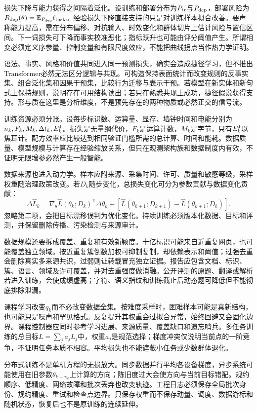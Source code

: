 损失下降与能力获得之间隔着泛化。设训练和部署分布为$P_{\rm tr}$与$P_{\rm dep}$，部署风险为$R_{\rm dep}(\theta)=\mathbb E_{P_{\rm dep}}\ell_{\rm task}$。经验损失下降直接支持的只是对训练样本拟合改善。要声称能力提高，需在分布偏移、对抗输入、时效变化和群体切片上估计风险与置信区间。下一词损失可下降而事实校准恶化；指标跃升也可能由评分阈值产生。所谓相变必须定义序参量、控制变量和有限尺度效应，不能把曲线拐点当作热力学证明。

语法、事实、风格和价值共同进入同一预测损失，确实会造成捷径学习，但不推出Transformer必然无法区分逻辑与共现。可构造保持表面统计而改变规则的反事实集、组合泛化集和因果干预集，比较行为迁移与表示干预。若模型在新实体和新句式上保持规则，说明存在可用结构读出；若只在熟悉共现上成功，捷径假说获得支持。形与质在这里是分析维度，不是预先存在的两种物质或必然正交的信号流。

训练资源必须分账。设每步标识数、运算量、显存、墙钟时间和电能分别为$n_k,F_k,M_k,\Delta t_k,E_k^{\rm J}$。损失是无量纲代价，$F_k$是运算计数，$M_k$是字节，只有$E_k^{\rm J}$以焦耳计。配方效率应比较达到相同验证门槛所需的总计算、时间和能耗。数据质量、模型规模与计算存在经验缩放关系，但只在观测架构族和数据制度内有效，不证明无限增参必然产生一般智能。

数据来源也进入动力学。样本应附来源、采集时间、许可、质量和敏感等级，采样权重随治理政策改变。若$D_k$随步变化，总损失变化可分为参数贡献与数据变化贡献：
\[
\Delta\widehat L_k=\nabla_\theta\widehat L(\theta_k;D_k)^{\mathsf T}
\Delta\theta_k+[\widehat L(\theta_{k+1};D_{k+1})-\widehat L(\theta_{k+1};D_k)].
\]
忽略第二项，会把目标漂移误判为优化变化。持续训练必须版本化数据、目标和评测，并保留删除传播、污染检测与来源审计。

数据规模还要拆成覆盖、重复和有效新颖度。十亿标识可能来自近重复网页，也可能覆盖独立领域。按近重复簇倒数加权可抑制复制，却依赖表示和阈值；过强去重会删除真实多来源共识，过弱则让转载冒充独立证据。报告应包含文档、标识、簇、语言、领域及许可覆盖，并对去重强度做消融。公开评测的原题、翻译或解析若进入训练，会使成绩虚高；字符、语义指纹和训练截止后动态题可降低但不能彻底排除泄漏。

课程学习改变$q_k$而不必改变数据全集。按难度采样时，困难样本可能是真新结构，也可能只是噪声和罕见格式。反复提升其权重会过拟合异常，始终回避又会固化边界。课程控制器应同时参考学习进展、来源质量、覆盖缺口和遗忘哨兵。多任务训练的总目标$L=\sum_j a_jL_j$中，权重$a_j$是规范选择；梯度冲突仅说明当前点的一阶竞争，不证明任务本质不相容。平均损失也不能遮蔽小任务或少数群体退化。

分布式训练不是单机方程的无损放大。同步数据并行平均各设备梯度，异步系统可能使用在旧参数$\theta_{k-\tau_w}$上计算的方向；陈旧度过大会使方向与当前目标错配。规约顺序、低精度、网络故障和批次丢弃也改变轨迹。工程日志必须保存全局批次身份、规约精度、重试和检查点边界。只保存权重而不保存动量、调度、数据游标和随机状态，恢复后也不是原训练的连续延伸。

